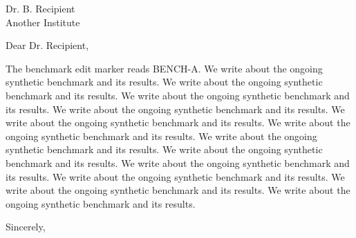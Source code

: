 \documentclass[11pt]{letter}
\begin{document}
\begin{letter}{Dr. B. Recipient \\ Another Institute}
\opening{Dear Dr. Recipient,}


The benchmark edit marker reads BENCH-A. We write about the ongoing synthetic benchmark and its results. We write about the ongoing synthetic benchmark and its results. We write about the ongoing synthetic benchmark and its results. We write about the ongoing synthetic benchmark and its results. We write about the ongoing synthetic benchmark and its results. We write about the ongoing synthetic benchmark and its results. We write about the ongoing synthetic benchmark and its results. We write about the ongoing synthetic benchmark and its results. We write about the ongoing synthetic benchmark and its results. We write about the ongoing synthetic benchmark and its results. We write about the ongoing synthetic benchmark and its results. We write about the ongoing synthetic benchmark and its results. 
\closing{Sincerely,}
\end{letter}
\end{document}
